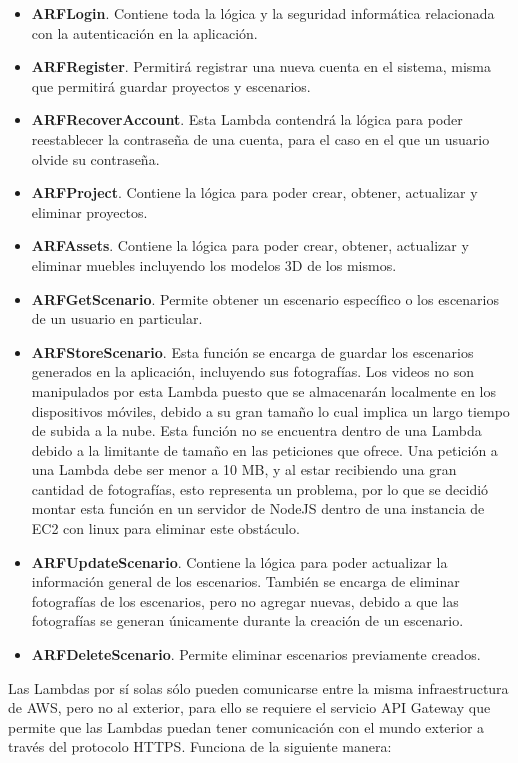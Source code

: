 \begin{itemize}
	\item\textbf{ARFLogin}. Contiene toda la lógica y la seguridad informática relacionada con la autenticación en la aplicación.
	\item\textbf{ARFRegister}. Permitirá registrar una nueva cuenta en el sistema, misma que permitirá guardar proyectos y escenarios.
	\item\textbf{ARFRecoverAccount}. Esta Lambda contendrá la lógica para poder reestablecer la contraseña de una cuenta, para el caso en el que un usuario olvide su contraseña.
	\item\textbf{ARFProject}. Contiene la lógica para poder crear, obtener, actualizar y eliminar proyectos.
	\item\textbf{ARFAssets}. Contiene la lógica para poder crear, obtener, actualizar y eliminar muebles incluyendo los modelos 3D de los mismos.
	\item\textbf{ARFGetScenario}. Permite obtener un escenario específico o los escenarios de un usuario en particular.
	\item\textbf{ARFStoreScenario}. Esta función se encarga de guardar los escenarios generados en la aplicación, incluyendo sus fotografías. Los videos no son manipulados por esta Lambda puesto que se almacenarán localmente en los dispositivos móviles, debido a su gran tamaño lo cual implica un largo tiempo de subida a la nube. Esta función no se encuentra dentro de una Lambda debido a la limitante de tamaño en las peticiones que ofrece. Una petición a una Lambda debe ser menor a 10 MB, y al estar recibiendo una gran cantidad de fotografías, esto representa un problema, por lo que se decidió montar esta función en un servidor de NodeJS dentro de una instancia de EC2 con linux para eliminar este obstáculo.
	\item\textbf{ARFUpdateScenario}. Contiene la lógica para poder actualizar la información general de los escenarios. También se encarga de eliminar fotografías de los escenarios, pero no agregar nuevas, debido a que las fotografías se generan únicamente durante la creación de un escenario.
	\item\textbf{ARFDeleteScenario}. Permite eliminar escenarios previamente creados.
\end{itemize}
\noindent
Las Lambdas por sí solas sólo pueden comunicarse entre la misma infraestructura de AWS, pero no al exterior, para ello se requiere el servicio API Gateway que permite que las Lambdas puedan tener comunicación con el mundo exterior a través del protocolo HTTPS. Funciona de la siguiente manera:
